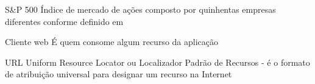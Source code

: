 \begin{siglas}
    \item[S\&P 500] Índice de mercado de ações composto por
                    quinhentas empresas diferentes conforme definido
                    em 

    \item[Cliente web] É quem consome algum recurso da aplicação

    \item[URL] Uniform Resource Locator ou Localizador Padrão de Recursos -
               é o formato de atribuição universal para designar um recurso na Internet
\end{siglas}
